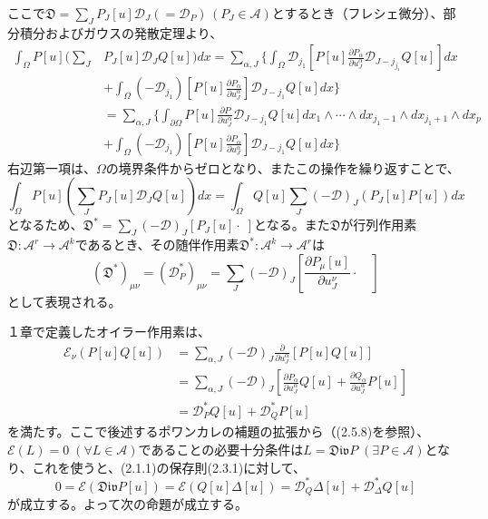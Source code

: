 \documentclass[a4paper, 11pt]{report}
\theoremstyle{definition}
\begin{document}
 ここで$\mathfrak{D}=\sum_J P_J[u]\mathcal{D}_J(=\mathcal{D}_P)\, (P_J\in \mathcal{A})$とするとき（フレシェ微分）、部分積分およびガウスの発散定理より、
\begin{align*}
\int _\Omega P[u](\sum _J &P_J[u] \mathcal{D}_JQ[u])dx = \sum _{\alpha,J} \{ \int_\Omega \mathcal{D}_{j_1} [P[u]\frac{\partial P_\alpha}{\partial u^\alpha_J}\mathcal{D}_{J-j_{j_1}}Q[u] ] dx \\
&+ \int _\Omega (-\mathcal{D}_{j_1})[P[u]\frac{\partial P_\alpha}{\partial u^\alpha_J}] \mathcal{D}_{J-{j_1}}Q[u]dx \} \\
&=\sum _{\alpha,J} \{ \int _{\partial \Omega} P[u]\frac{\partial P}{\partial u^\alpha_J}\mathcal{D}_{J-{j_1}}Q[u] dx_1\wedge \cdots \wedge dx_{j_1-1} \wedge dx_{j_1+1} \wedge dx_p \\
&+ \int _\Omega (-\mathcal{D}_{j_1})[P[u]\frac{\partial P_\alpha}{\partial u^\alpha_J}] \mathcal{D}_{J-{j_1}}Q[u]dx \}
\end{align*}
右辺第一項は、$\Omega$の境界条件からゼロとなり、またこの操作を繰り返すことで、
\begin{equation*}
\int _\Omega P[u](\sum _JP_J[u]\mathcal{D}_JQ[u])dx = \int _\Omega Q[u]\sum _J(-\mathcal{D})_J(P_J[u]P[u])dx
\end{equation*}
となるため、$\mathfrak{D}^*=\sum_J (-\mathcal{D})_J [ P_J[u]\cdot\; ]$となる。また$\mathfrak{D}$が行列作用素$\mathfrak{D}:\mathcal{A}^r\longrightarrow \mathcal{A}^k$であるとき、その随伴作用素$\mathfrak{D}^*:\mathcal{A}^k\longrightarrow \mathcal{A}^r$は
\begin{equation*}
(\mathfrak{D}^*)_{\mu\nu}=(\mathcal{D}_{P}^*)_{\mu\nu} = \sum _J(-\mathcal{D})_J[\frac{\partial P_\mu[u]}{\partial u^\nu_J}\cdot \quad ]
\end{equation*}
として表現される。

 １章で定義したオイラー作用素は、
\begin{align}
\mathcal{E}_\nu(P[u]Q[u]) &= \sum _{\alpha,J} (-\mathcal{D})_J \frac{\partial }{\partial u^\alpha_J} [P[u]Q[u]] \nonumber\\
&= \sum _{\alpha,J} (-\mathcal{D})_J [\frac{\partial P_\alpha}{\partial u^\alpha_J}Q[u] + \frac{\partial Q_\alpha}{\partial u^\alpha_J}P[u]] \nonumber\\
&= \mathcal{D}_{P}^*Q[u] + \mathcal{D}_{Q}^*P[u] %
\end{align}
を満たす。ここで後述するポワンカレの補題の拡張から（(2.5.8)を参照）、$\mathcal{E}(L)=0\; (\forall L\in \mathcal{A})$であることの必要十分条件は$L=\mathfrak{Div}P\; (\exists P\in \mathcal{A})$となり、これを使うと、(2.1.1)の保存則(2.3.1)に対して、
\begin{equation*}
0 = \mathcal{E}(\mathfrak{Div}P[u]) = \mathcal{E}(Q[u]\varDelta[u]) = \mathcal{D}_{Q}^*\varDelta[u] + \mathcal{D}_{\varDelta}^*Q[u]
\end{equation*}
が成立する。よって次の命題が成立する。
\end{document}
